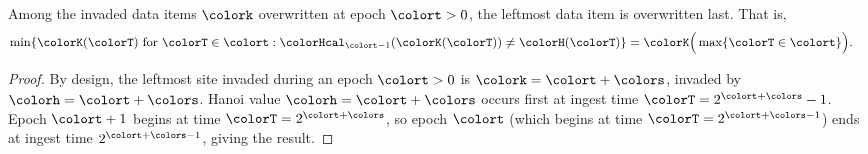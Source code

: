 \begin{lemma}
\label{thm:tilted-last-overwritten}
Among the invaded data items $\colork$ overwritten at epoch $\colort > 0$, the leftmost data item is overwritten last.
That is,
\begin{align*}
\min\{ \colorK(\colorT) \text{ for } \colorT \in \colort : \colorHcal_{\colort-1}(\colorK(\colorT)) \neq \colorH(\colorT) \}
&=
\colorK\Big(\max \{ \colorT \in \colort \}\Big).
\end{align*}
\end{lemma}
\begin{proof}
By design, the leftmost site invaded during an epoch $\colort > 0$ is $\colork = \colort + \colors$, invaded by \hv{} $\colorh = \colort + \colors$.
Hanoi value $\colorh = \colort + \colors$ occurs first at ingest time $\colorT = 2^{\colort + \colors} - 1$.
Epoch $\colort + 1$ begins at time $\colorT = 2^{\colort + \colors}$, so epoch $\colort$ (which begins at time $\colorT = 2^{\colort + \colors - 1}$) ends at ingest time $2^{\colort + \colors - 1}$, giving the result.
\end{proof}
